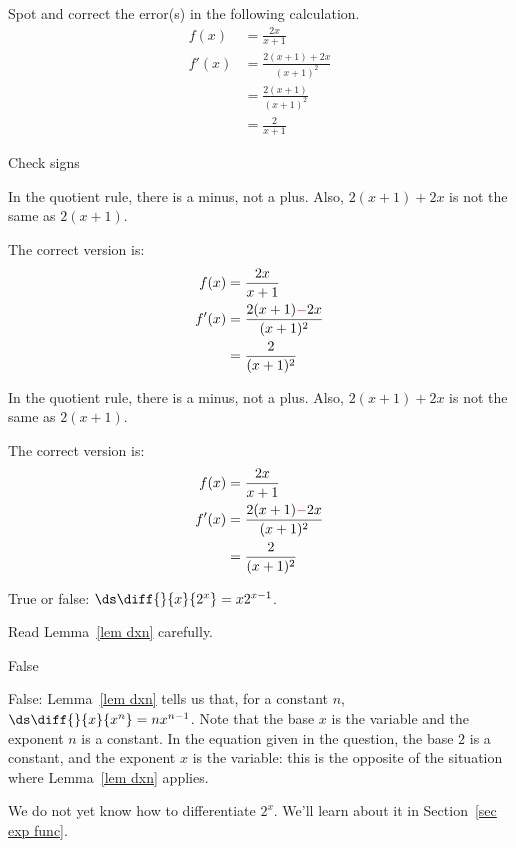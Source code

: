 %
%
\subsection*{\Conceptual}

\begin{Mquestion} Spot and correct the error(s) in the following calculation.
\begin{align*}
f(x)&=\frac{2x}{x+1}\\
f'(x)&=\frac{2(x+1)+2x}{(x+1)^2}\\
&=\frac{2(x+1)}{(x+1)^2}\\
&=\frac{2}{x+1}
\end{align*}
\end{Mquestion}
\begin{hint}  Check signs
\end{hint}
\begin{answer}   In the quotient rule, there is a minus, not a plus. Also, $2(x+1)+2x$ is not the same as $2(x+1)$.

 The correct version is:
\begin{align*}
f(x)&=\frac{2x}{x+1}\\
f'(x)&=\frac{2(x+1)\textcolor{red}{-}2x}{(x+1)^2}\\
&=\frac{2}{(x+1)^2}
\end{align*}
\end{answer}
\begin{solution}  In the quotient rule, there is a minus, not a plus. Also, $2(x+1)+2x$ is not the same as $2(x+1)$.

 The correct version is:
\begin{align*}
f(x)&=\frac{2x}{x+1}\\
f'(x)&=\frac{2(x+1)\textcolor{red}{-}2x}{(x+1)^2}\\
&=\frac{2}{(x+1)^2}
\end{align*}
\end{solution}

\begin{Mquestion}
True or false: $\ds\diff{}{x}\{2^x\}=x2^{x-1}$.
\end{Mquestion}
\begin{hint} Read Lemma~\ref*{lem dxn} carefully.
\end{hint}
\begin{answer} False
\end{answer}
\begin{solution}
False: Lemma~\ref*{lem dxn} tells us that, for a constant $n$, $\ds\diff{}{x}\{x^n\}=nx^{n-1}$. Note that the base $x$ is the variable and the exponent $n$ is a constant. In the equation given in the question, the base $2$ is a constant, and the exponent $x$ is the variable: this is the opposite of the situation where Lemma~\ref*{lem dxn} applies.

We do not yet know how to differentiate $2^x$. We'll learn about it in Section~\ref*{sec exp func}.
\end{solution}


